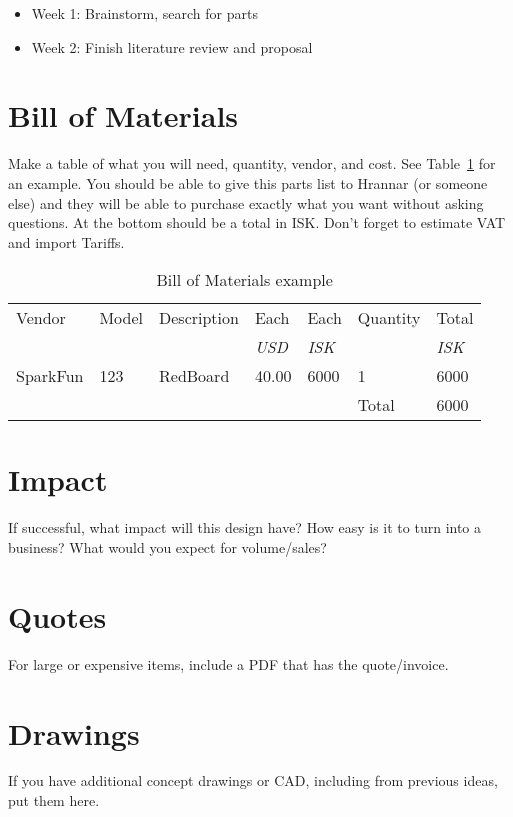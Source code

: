 \documentclass[draft]{rureport}
\begin{document}
\begin{itemize}
\item Week 1: Brainstorm, search for parts
\item Week 2: Finish literature review and proposal
  \end{itemize}

\section{Bill of Materials}
Make a table of what you will need, quantity, vendor, and cost.
See Table~\ref{tab:bom} for an example.
You should be able to give this parts list to Hrannar (or someone else) and they will be able to purchase exactly what you want without asking questions.
At the bottom should be a total in ISK.\@
Don't forget to estimate VAT and import Tariffs.


\begin{table}
  \centering
  \caption{Bill of Materials example}\label{tab:bom}
  \begin{tabular}{lllllll}\toprule
    Vendor &Model &Description &Each &Each &Quantity &Total\\
           &      &            &{\it USD} &{\it ISK}  &         &{\it ISK}  \\\midrule
    SparkFun &123 &RedBoard &40.00 &6000 &1 &6000\\
    \midrule
    & & & & &Total &6000\\
                                              
  \end{tabular}
\end{table}

\section{Impact}
If successful, what impact will this design have?
How easy is it to turn into a business?
What would you expect for volume/sales?




\newpage
\appendix
\section{Quotes}
For large or expensive items, include a PDF that has the quote/invoice.

\section{Drawings}
If you have additional concept drawings or CAD, including from previous ideas, put them here.
\end{document}
